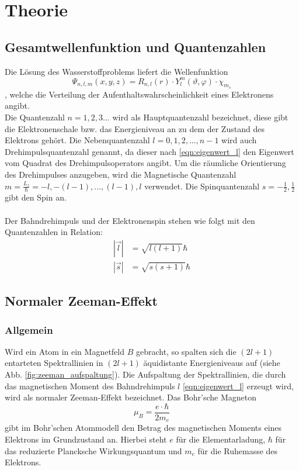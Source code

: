 \section{Theorie}
\label{sec:Theorie}

\subsection{Gesamtwellenfunktion und Quantenzahlen}
Die Lösung des Wasserstoffproblems liefert die Wellenfunktion
\begin{equation*}
    \Psi_{n, l, m} (x, y, z) = R_{n, l}(r) \cdot Y_l^m (\vartheta, \varphi) \cdot \chi_{m_s}
\end{equation*}
, welche die Verteilung der Aufenthaltswahrscheinlichkeit eines Elektronens angibt.\\
Die Quantenzahl $n = 1, 2, 3 ...$ wird als Hauptquantenzahl bezeichnet, diese gibt die Elektronenschale bzw. das Energieniveau an zu dem der Zustand des Elektrons gehört.
Die Nebenquantenzahl $l = 0, 1, 2, ..., n-1 $ wird auch Drehimpulsquantenzahl genannt, da dieser nach \autoref{eqn:eigenwert_l} den Eigenwert vom Quadrat des Drehimpulsoperators angibt. 
Um die räumliche Orientierung des Drehimpulses anzugeben, wird die Magnetische Quantenzahl $m = \frac{L_z}{\hbar} = -l, - (l-1), ..., (l-1), l$ verwendet.
Die Spinquantenzahl $s = -\frac{1}{2} , \frac{1}{2}$ gibt den Spin an.
\\ \\
Der Bahndrehimpuls und der Elektronenspin stehen wie folgt mit den Quantenzahlen in Relation:
\begin{align}
    |\vec{l}| &= \sqrt{l(l+1)} \hbar \label{eqn:eigenwert_l} \\
    |\vec{s}| &= \sqrt{s(s+1)} \hbar \label{eqn:eigenwert_s}
\end{align}

\subsection{Normaler Zeeman-Effekt}
\subsubsection{Allgemein}
Wird ein Atom in ein Magnetfeld $B$ gebracht, so spalten sich die $(2l + 1)$ entarteten Spektrallinien in $(2l + 1)$ äquidistante Energieniveaus auf (siehe Abb. \ref{fig:zeeman_aufspaltung}).
Die Aufspaltung der Spektrallinien, die durch das magnetischen Moment des Bahndrehimpuls $l$ \eqref{eqn:eigenwert_l} erzeugt wird, wird als normaler Zeeman-Effekt bezeichnet.
Das Bohr'sche Magneton
\begin{equation}
    \mu_B = \frac{e \cdot \hbar}{2 m_e}
    \label{eqn:magneton}
\end{equation}
gibt im Bohr'schen Atommodell den Betrag des magnetischen Moments eines Elektrons im Grundzustand an.
Hierbei steht $e$ für die Elementarladung, $\hbar$ für das reduzierte Plancksche Wirkungsquantum und $m_e$ für die Ruhemasse des Elektrons.

